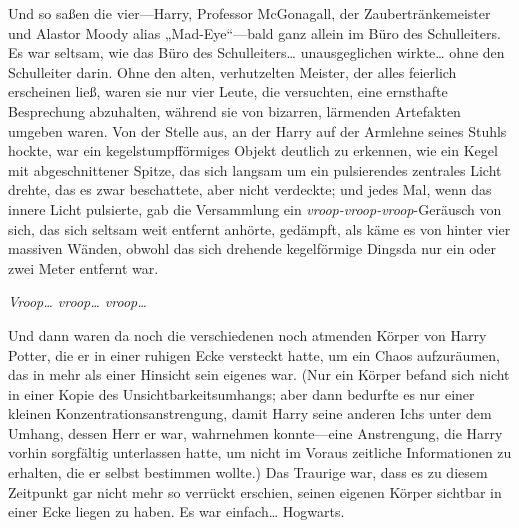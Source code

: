 Und so saßen die vier—Harry, Professor McGonagall, der Zaubertränkemeister und Alastor Moody alias „Mad-Eye“—bald ganz allein im Büro des Schulleiters. Es war seltsam, wie das Büro des Schulleiters… unausgeglichen wirkte… ohne den Schulleiter darin. Ohne den alten, verhutzelten Meister, der alles feierlich erscheinen ließ, waren sie nur vier Leute, die versuchten, eine ernsthafte Besprechung abzuhalten, während sie von bizarren, lärmenden Artefakten umgeben waren. Von der Stelle aus, an der Harry auf der Armlehne seines Stuhls hockte, war ein kegelstumpfförmiges Objekt deutlich zu erkennen, wie ein Kegel mit abgeschnittener Spitze, das sich langsam um ein pulsierendes zentrales Licht drehte, das es zwar beschattete, aber nicht verdeckte; und jedes Mal, wenn das innere Licht pulsierte, gab die Versammlung ein \emph{vroop-vroop-vroop}-Geräusch von sich, das sich seltsam weit entfernt anhörte, gedämpft, als käme es von hinter vier massiven Wänden, obwohl das sich drehende kegelförmige Dingsda nur ein oder zwei Meter entfernt war.

\emph{Vroop… vroop… vroop…}

Und dann waren da noch die verschiedenen noch atmenden Körper von Harry Potter, die er in einer ruhigen Ecke versteckt hatte, um ein Chaos aufzuräumen, das in mehr als einer Hinsicht sein eigenes war. (Nur ein Körper befand sich nicht in einer Kopie des Unsichtbarkeitsumhangs; aber dann bedurfte es nur einer kleinen Konzentrationsanstrengung, damit Harry seine anderen Ichs unter dem Umhang, dessen Herr er war, wahrnehmen konnte—eine Anstrengung, die Harry vorhin sorgfältig unterlassen hatte, um nicht im Voraus zeitliche Informationen zu erhalten, die er selbst bestimmen wollte.) Das Traurige war, dass es zu diesem Zeitpunkt gar nicht mehr so verrückt erschien, seinen eigenen Körper sichtbar in einer Ecke liegen zu haben. Es war einfach… Hogwarts.

